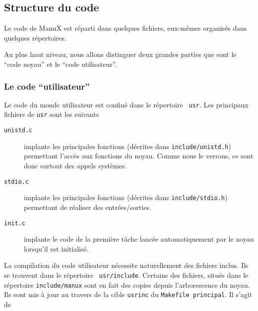 \subsection{Structure du code}

   Le code de ManuX est réparti dans quelques fichiers, eux-mêmes
organisés dans quelques répertoires.

   Au plus haut niveau, nous allons distinguer deux grandes parties
   que sont le ``code noyau'' et le ``code utilisateur''.
   
%
\subsubsection{Le code ``utilisateur''}

   Le code du monde utilisateur est confiné dans le répertoire {\tt
usr}.
  Les principaux fichiers de {\tt usr} sont les suivants

\begin{description}
   \item[{\tt unistd.c}] implante les principales fonctions (décrites
     dans {\tt include/unistd.h}) permettant l'accès aux fonctions du
     noyau. Comme nous le verrons, ce sont donc surtout des appels
     systèmes. 
   \item[{\tt stdio.c}] implante les principales fonctions (décrites
     dans {\tt include/stdio.h}) permettant de réaliser des
     entrées/sorties.
   \item[{\tt init.c}] implante le code de la première tâche lancée
     automatiquement par le noyau lorsqu'il est initialisé.
\end{description}

   La compilation du code utilisateur nécessite naturellement des
fichiers inclus. Ils se trouvent dans le répertoire {\tt
  usr/include}. Certains
     des fichiers, situés dans le répertoire {\tt include/manux} sont
     en fait des copies depuis l'arborescence du noyau. Ils sont mis à
     jour au travers de la cible {\tt usrinc} du {\tt Makefile
       principal}. Il s'agit de 


